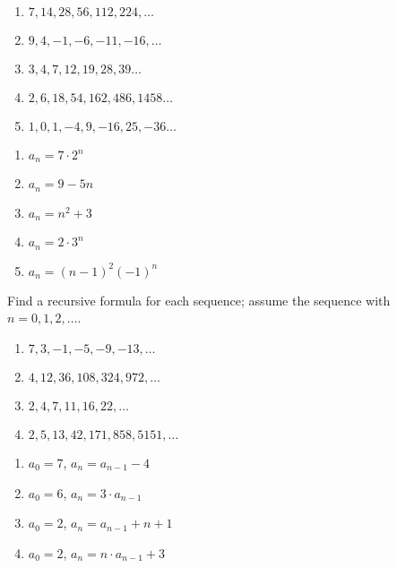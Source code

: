 \begin{questions}
\begin{minipage}{0.5\textwidth}
\begin{enumerate}[label=(\alph*),itemsep=0pt,parsep=0pt,topsep=0pt]
  \item $7, 14, 28, 56, 112, 224, \ldots$
  \item $9, 4, -1, -6, -11, -16, \ldots$
  \item $3, 4, 7, 12, 19, 28, 39 \ldots$
  \item $2, 6, 18, 54, 162, 486, 1458\ldots$
  \item $1, 0, 1, -4, 9, -16, 25, -36 \ldots$
\end{enumerate}
\end{minipage}
% 
\begin{minipage}{0.5\textwidth}
\begin{solution}
\begin{enumerate}[label=(\alph*),itemsep=0pt,parsep=0pt,topsep=0pt]
  \item $a_n = 7\cdot 2^n$
  \item $a_n = 9 - 5n$
  \item $a_n = n^2 + 3$
  \item $a_n = 2\cdot 3^n$ 
  \item $a_n = (n-1)^2 (-1)^n$
\end{enumerate}
\end{solution}
\end{minipage}



 Find a recursive formula for each sequence; assume the sequence with $n=0, 1, 2, \ldots$.

\begin{minipage}{0.5\textwidth}
\begin{enumerate}[label=(\alph*),itemsep=0pt,parsep=0pt,topsep=0pt]
  \item $7, 3, -1, -5, -9, -13, \ldots$
  \item $4, 12, 36, 108, 324, 972, \ldots$
  \item $2, 4, 7, 11, 16, 22, \ldots$
  \item $2, 5, 13, 42, 171, 858, 5151, \ldots$
\end{enumerate}
\end{minipage}
% 
\begin{minipage}{0.5\textwidth}
\begin{solution}
\begin{enumerate}[label=(\alph*),itemsep=0pt,parsep=0pt,topsep=0pt]
  \item $a_0 = 7$, $a_n = a_{n-1} -4$
  \item $a_0 = 6$, $a_n = 3\cdot a_{n-1}$
  \item $a_0 = 2$, $a_n = a_{n-1} + n + 1$
  \item $a_0 = 2$, $a_n = n\cdot a_{n-1} + 3$
\end{enumerate}
\end{solution}
\end{minipage}




\end{questions}
